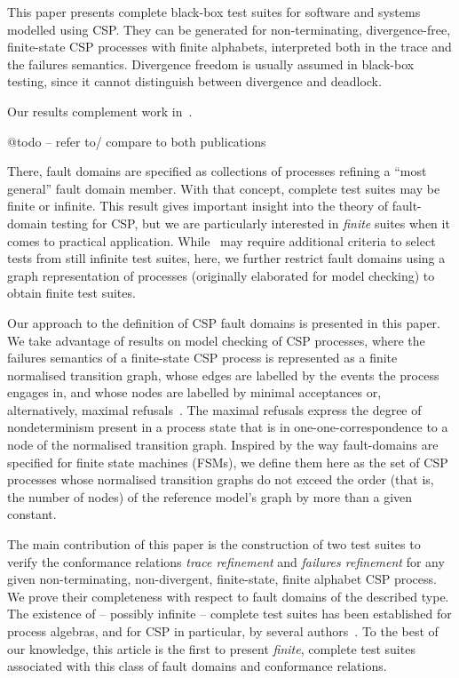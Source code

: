 This paper presents complete black-box test suites for software and systems
modelled using CSP. They can be generated for non-terminating,
divergence-free, finite-state CSP processes with finite alphabets,
interpreted both in the trace and the failures semantics. Divergence freedom
is usually assumed in black-box testing, since it cannot distinguish between
divergence and deadlock.

Our results complement work 
in~\cite{DBLP:conf/icfem/CavalcantiG07,DBLP:conf/pts/CavalcantiS17}. 

@todo -- refer to/ compare to both publications

There,
fault domains are specified as collections of processes refining a ``most
general'' fault domain member. With that concept, complete test suites may be
finite or infinite. This result gives important insight into the theory of
fault-domain testing for CSP, but we are particularly interested in {\it
finite} suites when it comes to practical application.
While~\cite{DBLP:conf/pts/CavalcantiS17} may require additional criteria to
select tests from still infinite test suites, here, we further restrict fault
domains using a graph representation of processes (originally elaborated for
model checking) to obtain finite test suites.

Our approach to the definition of CSP fault domains is presented in this
paper. We take advantage of results on model checking of CSP
processes, where the failures semantics of a finite-state CSP process is
represented as a finite normalised transition graph, whose edges are labelled
by the events the process engages in, and whose nodes are labelled by minimal
acceptances or, alternatively, maximal
refusals~\cite{Roscoe:1994:chapter}. The maximal refusals express the
degree of nondeterminism present in a process state that is in
one-one-correspondence to a node of the normalised transition graph. Inspired
by the way fault-domains are specified for finite state machines (FSMs),
we define them here as the set of CSP processes whose normalised transition
graphs do not exceed the order (that is, the number of nodes) of the
reference model's graph by more than a given constant.

The main contribution of this paper is the construction of two test suites to
verify the conformance relations \emph{trace refinement} and \emph{failures
refinement} for any given non-terminating, non-divergent, finite-state,
finite alphabet CSP process. We prove their completeness with respect to
fault domains of the described type.  The existence of -- possibly infinite
-- complete test suites has been established for process algebras, and for
CSP in particular, by several
authors~\cite{Hennessy:1988:ATP:50497,Schneider:1995:OST:203471.203475,DBLP:conf/fm/PeleskaS96,peleska1997a,DBLP:conf/icfem/CavalcantiG07,DBLP:conf/pts/CavalcantiS17}.
To the best of our knowledge, this article is the first to present {\it
finite}, complete test suites associated with this class of fault domains and
conformance relations.


